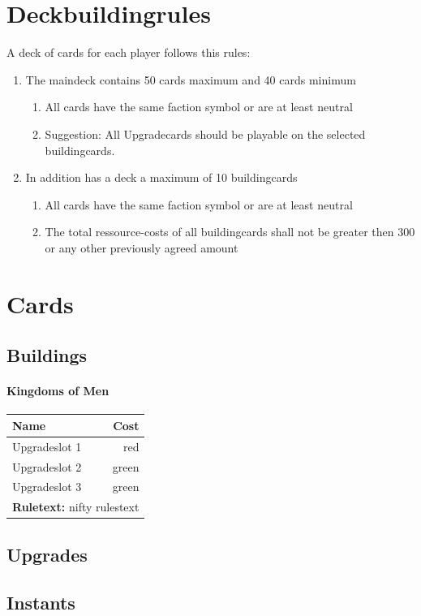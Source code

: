 \documentclass[a5paper,pagesize,10pt,bibtotoc,pointlessnumbers,
normalheadings,DIV=9,twoside=false]{scrbook}
\begin{document}
\chapter{Deckbuildingrules}

A deck of cards for each player follows this rules:

\begin{enumerate}
\item The maindeck contains 50 cards maximum and 40 cards minimum
\begin{enumerate}
\item All cards have the same faction symbol or are at least neutral
\item Suggestion: All Upgradecards should be playable on the selected buildingcards.
\end{enumerate}
\item In addition has a deck a maximum of 10 buildingcards
\begin{enumerate}
\item All cards have the same faction symbol or are at least neutral
\item The total ressource-costs of all buildingcards shall not be greater then 300 or any other previously agreed amount
\end{enumerate}
\end{enumerate}

\chapter{Cards}

\section{Buildings}

\subsubsection{Kingdoms of Men}

 \begin{tabular}{||l r||} 
 \hline
  \rowcolor{Gainsboro!60}
Name & Cost  \\
\hline
Upgradeslot 1 & red  \\
Upgradeslot 2 & green \\
Upgradeslot 3 & green \\
\hline
 \multicolumn{2}{||l||}{\textbf{Ruletext:} nifty rulestext}\\
\hline
 
 \end{tabular}


\section{Upgrades}

\section{Instants}
\end{document}
